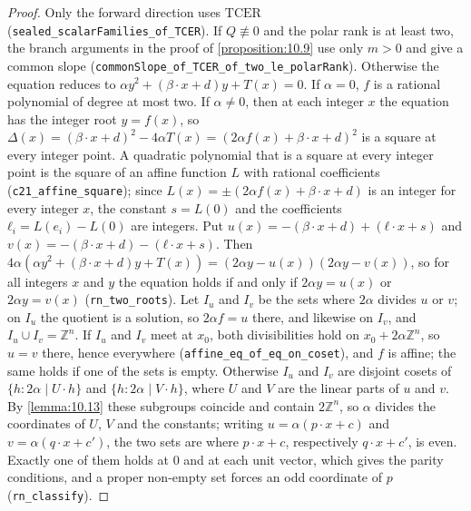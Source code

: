 \documentclass[11pt]{article}
\theoremstyle{plain}
\theoremstyle{definition}
\theoremstyle{remark}
\theoremstyle{plain}
\theoremstyle{definition}
\theoremstyle{remark}
\theoremstyle{plain}
\theoremstyle{definition}
\theoremstyle{remark}
\begin{document}
\begin{proof}
Only the forward direction uses $\mathrm{TCER}$ (\texttt{sealed\_scalarFamilies\_of\_TCER}). If $Q ≢ 0$ and the polar rank is at least two, the branch arguments in the proof of \cref{proposition:10.9} use only $m > 0$ and give a common slope (\texttt{commonSlope\_of\_TCER\_of\_two\_le\_polarRank}). Otherwise the equation reduces to $αy^{2} + (β · x + d)y + T(x) = 0$. If $α = 0$, $f$ is a rational polynomial of degree at most two. If $α ≠ 0$, then at each integer $x$ the equation has the integer root $y = f(x)$, so $Δ(x) = (β · x + d)^{2} - 4αT(x) = (2αf(x) + β · x + d)^{2}$ is a square at every integer point. A quadratic polynomial that is a square at every integer point is the square of an affine function $L$ with rational coefficients (\texttt{c21\_affine\_square}); since $L(x) = ±(2αf(x) + β · x + d)$ is an integer for every integer $x$, the constant $s = L(0)$ and the coefficients $ℓ_{i} = L(e_{i}) - L(0)$ are integers. Put $u(x) = -(β · x + d) + (ℓ · x + s)$ and $v(x) = -(β · x + d) - (ℓ · x + s)$. Then $4α(αy^{2} + (β · x + d)y + T(x)) = (2αy - u(x))(2αy - v(x))$, so for all integers $x$ and $y$ the equation holds if and only if $2αy = u(x)$ or $2αy = v(x)$ (\texttt{rn\_two\_roots}). Let $I_{u}$ and $I_{v}$ be the sets where $2α$ divides $u$ or $v$; on $I_{u}$ the quotient is a solution, so $2αf = u$ there, and likewise on $I_{v}$, and $I_{u} ∪ I_{v} = ℤ^{n}$. If $I_{u}$ and $I_{v}$ meet at $x_{0}$, both divisibilities hold on $x_{0} + 2αℤ^{n}$, so $u = v$ there, hence everywhere (\texttt{affine\_eq\_of\_eq\_on\_coset}), and $f$ is affine; the same holds if one of the sets is empty. Otherwise $I_{u}$ and $I_{v}$ are disjoint cosets of $\{h : 2α ∣ U · h\}$ and $\{h : 2α ∣ V · h\}$, where $U$ and $V$ are the linear parts of $u$ and $v$. By \cref{lemma:10.13} these subgroups coincide and contain $2ℤ^{n}$, so $α$ divides the coordinates of $U$, $V$ and the constants; writing $u = α(p · x + c)$ and $v = α(q · x + c')$, the two sets are where $p · x + c$, respectively $q · x + c'$, is even. Exactly one of them holds at $0$ and at each unit vector, which gives the parity conditions, and a proper non-empty set forces an odd coordinate of $p$ (\texttt{rn\_classify}).
\end{proof}
\end{document}
